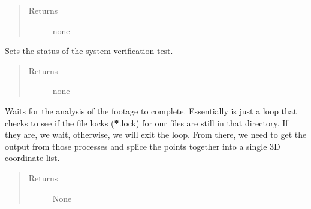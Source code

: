 \documentclass[letterpaper,10pt,english]{sphinxmanual}
\begin{document}
\begin{fulllineitems}
\begin{fulllineitems}
\begin{quote}
\begin{description}
\item[{Returns}] \leavevmode
none

\end{description}\end{quote}

\end{fulllineitems}


\begin{fulllineitems}
\label{\detokenize{index:src.Controllers.Program_Controller.Controller.updateFlightStatus}}
Sets the status of the system verification test.
\begin{quote}\begin{description}
\item[{Returns}] \leavevmode
none

\end{description}\end{quote}

\end{fulllineitems}


\begin{fulllineitems}
\label{\detokenize{index:src.Controllers.Program_Controller.Controller.wait_for_analysis}}
Waits for the analysis of the footage to complete. Essentially is just a loop that checks to
see if the file locks ({\color{red}\bfseries{}*}.lock) for our files are still in that directory. If they are, we wait,
otherwise, we will exit the loop. From there, we need to get the output from those processes and splice
the points together into a single 3D coordinate list.
\begin{quote}\begin{description}
\item[{Returns}] \leavevmode
None

\end{description}\end{quote}

\end{fulllineitems}


\end{fulllineitems}
\end{document}
